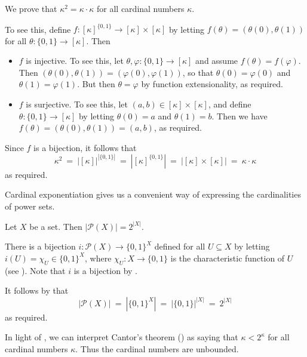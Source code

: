 \begin{example}
We prove that $\kappa^2 = \kappa \cdot \kappa$ for all cardinal numbers $\kappa$.

To see this, define $f : [\kappa]^{\{0,1\}} \to [\kappa] \times [\kappa]$ by letting $f(\theta) = (\theta(0), \theta(1))$ for all $\theta : \{0,1\} \to [\kappa]$. Then
\begin{itemize}
\item $f$ is injective. To see this, let $\theta, \varphi : \{0,1\} \to [\kappa]$ and assume $f(\theta) = f(\varphi)$. Then $(\theta(0), \theta(1)) = (\varphi(0), \varphi(1))$, so that $\theta(0) = \varphi(0)$ and $\theta(1) = \varphi(1)$. But then $\theta = \varphi$ by function extensionality, as required.
\item $f$ is surjective. To see this, let $(a,b) \in [\kappa] \times [\kappa]$, and define $\theta : \{ 0,1 \} \to [\kappa]$ by letting $\theta(0)=a$ and $\theta(1)=b$. Then we have $f(\theta) = (\theta(0), \theta(1)) = (a,b)$, as required.
\end{itemize}
Since $f$ is a bijection, it follows that
\[ \kappa^2 ~=~ |[\kappa]|^{|\{0,1\}|} ~=~ |[\kappa]^{\{0,1\}}| ~=~ |[\kappa] \times [\kappa]| ~=~ \kappa \cdot \kappa \]
as required.
\end{example}

Cardinal exponentiation gives us a convenient way of expressing the cardinalities of power sets.

\begin{theorem}
\label{thmCardinalityOfPowerSet}
Let $X$ be a set. Then $|\mathcal{P}(X)| = 2^{|X|}$.
\end{theorem}

\begin{cproof}
There is a bijection $i : \mathcal{P}(X) \to \{ 0,1 \}^{X}$ defined for all $U \subseteq X$ by letting $i(U) = \chi_U \in \{ 0,1 \}^X$, where $\chi_U : X \to \{ 0,1 \}$ is the characteristic function of $U$ (see ). Note that $i$ is a bijection by .

It follows by  that
\[ |\mathcal{P}(X)| ~=~ |\{ 0,1 \}^X| ~=~ |\{0,1\}|^{|X|} ~=~ 2^{|X|} \]
as required.
\end{cproof}

In light of , we can interpret Cantor's theorem () as saying that $\kappa < 2^{\kappa}$ for all cardinal numbers $\kappa$. Thus the cardinal numbers are unbounded.

